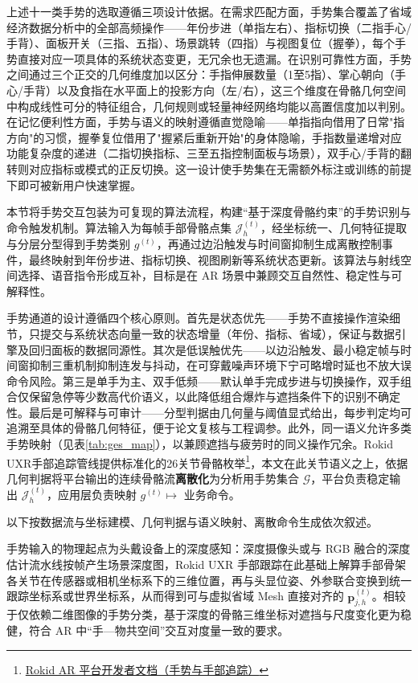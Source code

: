 上述十一类手势的选取遵循三项设计依据。在需求匹配方面，手势集合覆盖了省域经济数据分析中的全部高频操作——年份步进（单指左右）、指标切换（二指手心/手背）、面板开关（三指、五指）、场景跳转（四指）与视图复位（握拳），每个手势直接对应一项具体的系统状态变更，无冗余也无遗漏。在识别可靠性方面，手势之间通过三个正交的几何维度加以区分：手指伸展数量（1至5指）、掌心朝向（手心/手背）以及食指在水平面上的投影方向（左/右），这三个维度在骨骼几何空间中构成线性可分的特征组合，几何规则或轻量神经网络均能以高置信度加以判别。在记忆便利性方面，手势与语义的映射遵循直觉隐喻——单指指向借用了日常"指方向"的习惯，握拳复位借用了"握紧后重新开始"的身体隐喻，手指数量递增对应功能复杂度的递进（二指切换指标、三至五指控制面板与场景），双手心/手背的翻转则对应指标或模式的正反切换。这一设计使手势集在无需额外标注或训练的前提下即可被新用户快速掌握。

\medskip
本节将手势交互包装为可复现的算法流程，构建“基于深度骨骼约束”的手势识别与命令触发机制。算法输入为每帧手部骨骼点集 $\mathcal{J}_h^{(t)}$，经坐标统一、几何特征提取与分层分型得到手势类别 $g^{(t)}$，再通过边沿触发与时间窗抑制生成离散控制事件，最终映射到年份步进、指标切换、视图刷新等系统状态更新。该算法与射线空间选择、语音指令形成互补，目标是在 AR 场景中兼顾交互自然性、稳定性与可解释性。

手势通道的设计遵循四个核心原则。首先是状态优先——手势不直接操作渲染细节，只提交与系统状态向量一致的状态增量（年份、指标、省域），保证与数据引擎及回归面板的数据同源性。其次是低误触优先——以边沿触发、最小稳定帧与时间窗抑制三重机制抑制连发与抖动，在可穿戴噪声环境下宁可略增时延也不放大误命令风险。第三是单手为主、双手低频——默认单手完成步进与切换操作，双手组合仅保留急停等少数高代价语义，以此降低组合爆炸与遮挡条件下的识别不确定性。最后是可解释与可审计——分型判据由几何量与阈值显式给出，每步判定均可追溯至具体的骨骼几何特征，便于论文复核与工程调参。此外，同一语义允许多类手势映射（见表\ref{tab:ges_map}），以兼顾遮挡与疲劳时的同义操作冗余。Rokid UXR手部追踪管线提供标准化的26关节骨骼枚举\footnote{\href{https://custom.rokid.com/prod/rokid_web/c88be4bcde4c42c0b8b53409e1fa1701/pc/cn/8ad2e74dbd7c4f5bb21a964dbdd5512d.html?documentId=dbdf788eac3541a2a7d73b5e2bc1f89f}{Rokid AR 平台开发者文档（手势与手部追踪）}}，本文在此关节语义之上，依据几何判据将平台输出的连续骨骼流\textbf{离散化}为分析用手势集合 $\mathcal{G}$，平台负责稳定输出 $\mathcal{J}_h^{(t)}$，应用层负责映射 $g^{(t)}\mapsto$ 业务命令。

以下按数据流与坐标建模、几何判据与语义映射、离散命令生成依次叙述。


手势输入的物理起点为头戴设备上的深度感知：深度摄像头或与 RGB 融合的深度估计流水线按帧产生场景深度图，Rokid UXR 手部跟踪在此基础上解算手部骨架各关节在传感器或相机坐标系下的三维位置，再与头显位姿、外参联合变换到统一跟踪坐标系或世界坐标系，从而得到可与虚拟省域 Mesh 直接对齐的 $\mathbf{p}_{j,h}^{(t)}$。相较于仅依赖二维图像的手势分类，基于深度的骨骼三维坐标对遮挡与尺度变化更为稳健，符合 AR 中“手—物共空间”交互对度量一致的要求\cite{wang2026ar_io_survey}。

